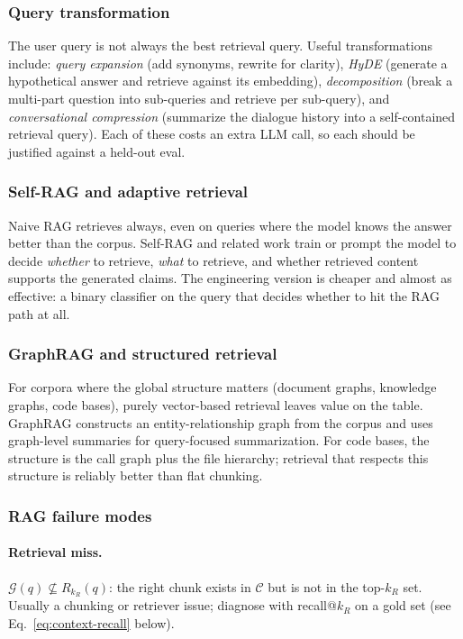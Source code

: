 \subsubsection{Query transformation}

The user query is not always the best retrieval query. Useful
transformations include: \emph{query expansion} (add synonyms,
rewrite for clarity), \emph{HyDE} (generate a hypothetical answer
and retrieve against its embedding), \emph{decomposition} (break a
multi-part question into sub-queries and retrieve per sub-query),
and \emph{conversational compression} (summarize the dialogue
history into a self-contained retrieval query). Each of these
costs an extra LLM call, so each should be justified against a
held-out eval.

\subsubsection{Self-RAG and adaptive retrieval}

Naive RAG retrieves always, even on queries where the model
knows the answer better than the corpus. Self-RAG
\citep{asai2024selfrag} and related work train or prompt the model
to decide \emph{whether} to retrieve, \emph{what} to retrieve, and
whether retrieved content supports the generated claims. The
engineering version is cheaper and almost as effective: a binary
classifier on the query that decides whether to hit the RAG path
at all.

\subsubsection{GraphRAG and structured retrieval}

For corpora where the global structure matters (document graphs,
knowledge graphs, code bases), purely vector-based retrieval leaves
value on the table. GraphRAG \citep{edge2024graphrag} constructs an
entity-relationship graph from the corpus and uses graph-level
summaries for query-focused summarization. For code bases, the
structure is the call graph plus the file hierarchy; retrieval that
respects this structure is reliably better than flat chunking.

\subsubsection{RAG failure modes}
\label{sec:rag-failure-modes}

\paragraph{Retrieval miss.} $\mathcal{G}(q) \not\subseteq R_{k_R}(q)$: the
right chunk exists in $\mathcal{C}$ but is not in the top-$k_R$ set.
Usually a chunking or retriever issue; diagnose with
recall@$k_R$ on a gold set (see Eq.~\eqref{eq:context-recall}
below).

